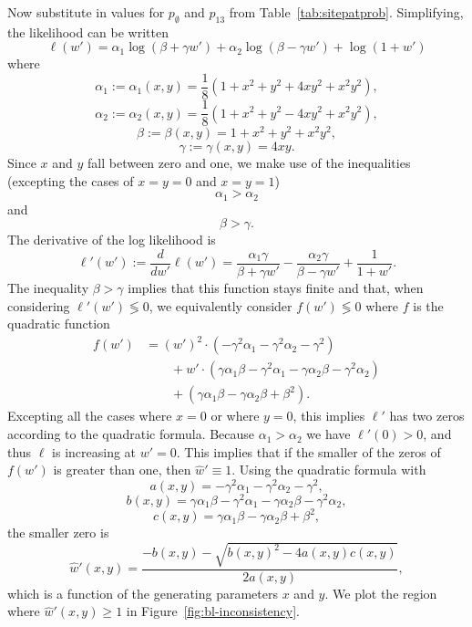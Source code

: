 \documentclass{article}
\begin{document}
Now substitute in values for $p_{\emptyset}$ and $p_{13}$ from Table~\ref{tab:sitepatprob}.
Simplifying, the likelihood can be written
$$
\ell(w') = \alpha_1\log(\beta+\gamma w') + \alpha_2\log(\beta-\gamma w') + \log(1+w')
$$
where
$$
\alpha_1 := \alpha_1(x, y) = \frac{1}{8} (1+x^2+y^2+4xy^2+x^2y^2),
$$
$$
\alpha_2 := \alpha_2(x, y) = \frac{1}{8}(1+x^2+y^2-4xy^2+x^2y^2),
$$
$$
\beta := \beta(x, y) = 1+x^2+y^2+x^2y^2,
$$
$$
\gamma := \gamma(x, y) = 4xy.
$$
Since $x$ and $y$ fall between zero and one, we make use of the inequalities (excepting the cases of $x=y=0$ and $x=y=1$)
$$
\alpha_1 > \alpha_2
$$
and
$$
\beta > \gamma.
$$
The derivative of the log likelihood is
$$
\ell'(w') := \frac{d}{dw'} \ell(w') = \frac{\alpha_1 \gamma}{\beta+\gamma w'} - \frac{\alpha_2 \gamma}{\beta-\gamma w'} + \frac{1}{1+w'}.
$$
The inequality $\beta > \gamma$ implies that this function stays finite and that, when considering $\ell'(w') \lessgtr 0$, we equivalently consider $f(w') \lessgtr 0$ where $f$ is the quadratic function
\begin{align*}
f(w') &= (w')^2\cdot(-\gamma^2\alpha_1-\gamma^2\alpha_2-\gamma^2) \\
      &\qquad + w'\cdot(\gamma\alpha_1\beta-\gamma^2\alpha_1-\gamma\alpha_2\beta-\gamma^2\alpha_2) \\
      &\qquad + (\gamma\alpha_1\beta-\gamma\alpha_2\beta+\beta^2).
\end{align*}
Excepting all the cases where $x=0$ or where $y=0$, this implies $\ell'$ has two zeros according to the quadratic formula.
Because $\alpha_1 > \alpha_2$ we have $\ell'(0) > 0$, and thus $\ell$ is increasing at $w'=0$.
This implies that if the smaller of the zeros of $f(w')$ is greater than one, then $\hat{w}' \equiv 1$.
Using the quadratic formula with
$$
a(x, y) = -\gamma^2 \alpha_1 - \gamma^2 \alpha_2 - \gamma^2,
$$
$$
b(x, y) = \gamma \alpha_1 \beta - \gamma^2\alpha_1 - \gamma \alpha_2 \beta - \gamma^2 \alpha_2,
$$
$$
c(x, y) = \gamma \alpha_1 \beta - \gamma \alpha_2 \beta + \beta^2,
$$
the smaller zero is
$$
\hat{w}'(x, y) = \frac{-b(x, y) - \sqrt{b(x, y)^2 - 4a(x, y)c(x, y)}}{2a(x, y)},
$$
which is a function of the generating parameters $x$ and $y$.
We plot the region where $\hat{w}'(x, y) \ge 1$ in Figure~\ref{fig:bl-inconsistency}.
\end{document}
